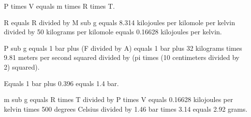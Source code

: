 P times V equals m times R times T.  

R equals R divided by M sub g equals 8.314 kilojoules per kilomole per kelvin divided by 50 kilograms per kilomole equals 0.16628 kilojoules per kelvin.  

P sub g equals 1 bar plus (F divided by A) equals 1 bar plus 32 kilograms times 9.81 meters per second squared divided by (pi times (10 centimeters divided by 2) squared).  

Equals 1 bar plus 0.396 equals 1.4 bar.  

m sub g equals R times T divided by P times V equals 0.16628 kilojoules per kelvin times 500 degrees Celsius divided by 1.46 bar times 3.14 equals 2.92 grams.